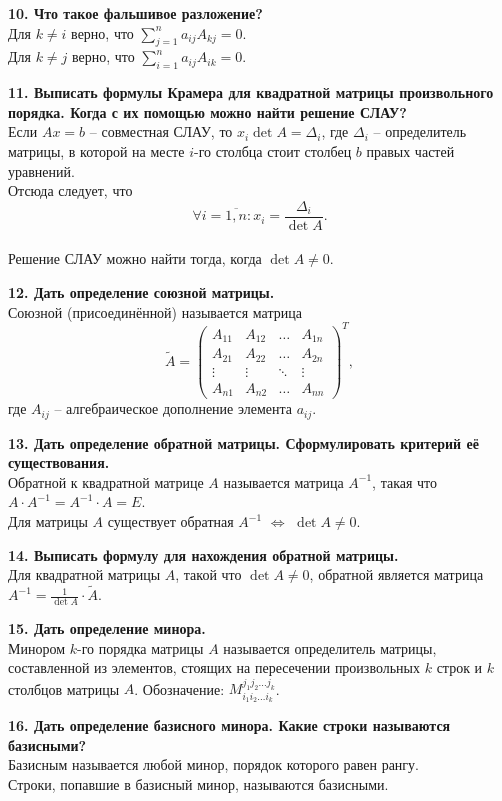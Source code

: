 \documentclass[11pt,a4paper]{article}
\begin{document}
\textbf{10. Что такое фальшивое разложение?\\}
Для $k \neq i$ верно, что $\sum_{j = 1}^n a_{ij} A_{kj} = 0$.\\
Для $k \neq j$ верно, что $\sum_{i = 1}^n a_{ij} A_{ik} = 0$.

\textbf{11. Выписать формулы Крамера для квадратной матрицы произвольного порядка. Когда с их помощью можно найти решение СЛАУ?\\}
Если $Ax = b$ -- совместная СЛАУ, то $x_{i} \det A = \Delta_i$, где $\Delta_i$ -- определитель матрицы, в которой на месте $i$-го столбца стоит столбец $b$ правых частей уравнений.\\
Отсюда следует, что $$\forall i = \overline{1, n}: x_i = \frac{\Delta_i}{\det A}.$$\\
Решение СЛАУ можно найти тогда, когда $\det A \neq 0$.

\textbf{12. Дать определение союзной матрицы.\\}
Союзной (присоединённой) называется матрица
$$\tilde{A} = \left( \begin{matrix}
A_{11} & A_{12} & \hdots & A_{1n} \\
A_{21} & A_{22} & \hdots & A_{2n} \\
\vdots & \vdots & \ddots & \vdots \\
A_{n1} & A_{n2} & \hdots & A_{nn}
\end{matrix} \right)^T,$$
где $A_{ij}$ -- алгебраическое дополнение элемента $a_{ij}$.

\textbf{13. Дать определение обратной матрицы. Сформулировать критерий её существования.\\}
Обратной к квадратной матрице $A$ называется матрица $A^{-1}$, такая что $A \cdot A^{-1} = A^{-1} \cdot A = E$.\\
Для матрицы $A$ существует обратная $A^{-1}$ $\Leftrightarrow$ $\det A \neq 0$.

\textbf{14. Выписать формулу для нахождения обратной матрицы.\\}
Для квадратной матрицы $A$, такой что $\det A \neq 0$, обратной является матрица $A^{-1} = \frac{1}{\det A} \cdot \tilde{A}$.

\textbf{15. Дать определение минора.\\}
Минором $k$-го порядка матрицы $A$ называется определитель матрицы, составленной из элементов, стоящих на пересечении произвольных $k$ строк и $k$ столбцов матрицы $A$. Обозначение: $M_{i_1 i_2 \hdots i_k}^{j_1 j_2 \hdots j_k}$.
\pagebreak

\textbf{16. Дать определение базисного минора. Какие строки называются базисными?\\}
Базисным называется любой минор, порядок которого равен рангу.\\
Строки, попавшие в базисный минор, называются базисными.
\end{document}
